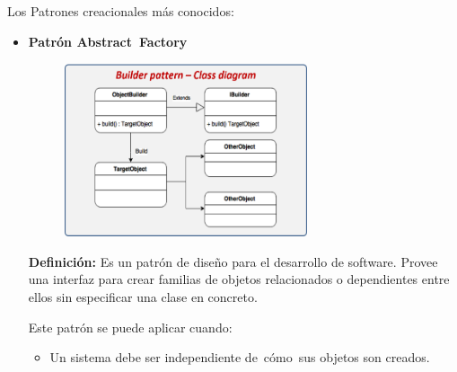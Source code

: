 \documentclass[12pt]{article}
\begin{document}
\begin{multicols}{2}
\begin{enumerate}
\vspace{\baselineskip}
{\fontsize{9pt}{10.8pt}\selectfont Los Patrones creacionales más conocidos:\par}\par


\vspace{\baselineskip}
\begin{itemize}
	\item {\fontsize{9pt}{10.8pt}\selectfont \textbf{Patrón Abstract Factory} \par}\par


\vspace{\baselineskip}



\begin{figure}[H]		\includegraphics[width=2.81in,height=2.01in]{./media/image6.png}
\end{figure}



{\fontsize{9pt}{10.8pt}\selectfont \textbf{Definición:} Es un patrón de diseño para el desarrollo de software. Provee una interfaz para crear familias de objetos relacionados o dependientes entre ellos sin especificar una clase en concreto.\par}\par


\vspace{\baselineskip}
{\fontsize{9pt}{10.8pt}\selectfont Este patrón se puede aplicar cuando: \par}\par

\begin{itemize}
	\item {\fontsize{9pt}{10.8pt}\selectfont Un sistema debe ser independiente de cómo sus objetos son creados. \par}\par


\end{itemize}
\end{itemize}
\end{enumerate}
\end{multicols}
\end{document}
